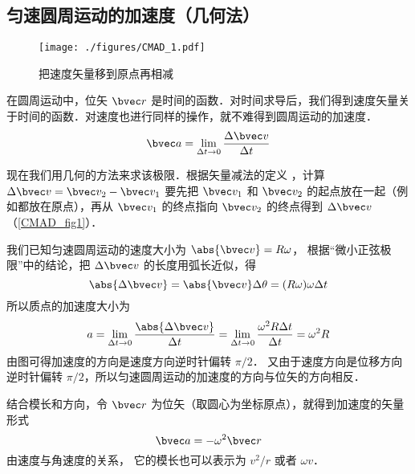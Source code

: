 

\subsection{匀速圆周运动的加速度（几何法）}

\begin{figure}[ht]
\centering
\texttt{[image: ./figures/CMAD\_1.pdf]}
\caption{把速度矢量移到原点再相减}\label{CMAD_fig1}
\end{figure}

在圆周运动中，位矢 $\bvec r$ 是时间的函数．对时间求导后，我们得到速度矢量关于时间的函数．对速度也进行同样的操作，就不难得到圆周运动的加速度．
\begin{equation}
\bvec a = \lim_{\Delta t \to 0} \frac{\Delta \bvec v}{\Delta t}
\end{equation}

现在我们用几何的方法来求该极限．根据矢量减法的定义%
，计算 $\Delta \bvec v = \bvec v_2 - \bvec v_1$ 要先把 $\bvec v_1$ 和 $\bvec v_2$ 的起点放在一起（例如都放在原点），再从 $\bvec v_1$ 的终点指向 $\bvec v_2$ 的终点得到 $\Delta \bvec v$ （\autoref{CMAD_fig1}）． 

我们已知匀速圆周运动的速度大小为 $\abs{\bvec v} = R\omega$， 根据“微小正弦极限”中的结论，把 $\Delta\bvec v$ 的长度用弧长近似，得
\begin{equation}
\abs{\Delta \bvec v} = \abs{\bvec v}\Delta \theta  = (R\omega)\omega \Delta t
\end{equation}
所以质点的加速度大小为
\begin{equation}
a =\lim_{\Delta t \to 0} \frac{\abs{\Delta \bvec v}}{\Delta t} =  \lim_{\Delta t \to 0} \frac{\omega ^2 R \Delta t}{\Delta t} = \omega ^2 R
\end{equation}
由图可得加速度的方向是速度方向逆时针偏转 $\pi/2$． 又由于速度方向是位移方向逆时针偏转 $\pi/2$，所以匀速圆周运动的加速度的方向与位矢的方向相反．

结合模长和方向，令 $\bvec r$ 为位矢（取圆心为坐标原点），就得到加速度的矢量形式
\begin{equation}\label{CMAD_eq4}
\bvec a =  - \omega ^2 \bvec r
\end{equation}
由速度与角速度的关系， %
它的模长也可以表示为 $v^2/r$ 或者 $\omega v$．

